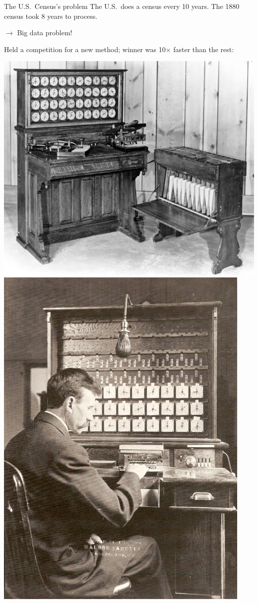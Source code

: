 \documentclass[aspectratio=169]{beamer}
\begin{document}
\begin{frame}{The U.S.\ Census's problem}
\large
\vspace{0.35 cm}
The U.S.\ does a census every 10 years. The 1880 census took 8 years to process.
\begin{center}
$\longrightarrow$ Big data problem!
\end{center}

\vspace{0.15 cm}
Held a competition for a new method; winner was 10$\times$ faster than the rest:

\begin{center}
\includegraphics[height=5.3 cm]{hollerith.jpg}\hspace{1 cm}\includegraphics[height=5.3 cm]{1908_Hollerith_Machine.jpg}
\end{center}
\end{frame}
\end{document}
